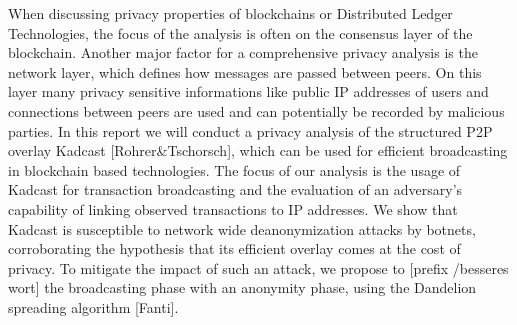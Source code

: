 When discussing privacy properties of blockchains or Distributed Ledger Technologies, the
focus of the analysis is often on the consensus layer of the blockchain.
Another major factor for a comprehensive privacy analysis is
the network layer, which defines how messages are passed between peers.
On this layer many privacy sensitive informations like public IP addresses of users and connections between peers
are used and can potentially be recorded by malicious parties.
In this report we will conduct a privacy analysis of the structured P2P overlay Kadcast [Rohrer\&Tschorsch],
which can be used for efficient broadcasting in blockchain based technologies.
The focus of our analysis is the usage of Kadcast for transaction broadcasting and the evaluation of an adversary's capability
of linking observed transactions to IP addresses.
We show that Kadcast is susceptible to network wide deanonymization attacks by botnets, corroborating the hypothesis that its
efficient overlay comes at the cost of privacy.
To mitigate the impact of such an attack, we propose to [prefix /besseres wort] the broadcasting phase with an anonymity phase, using
the Dandelion spreading algorithm [Fanti].